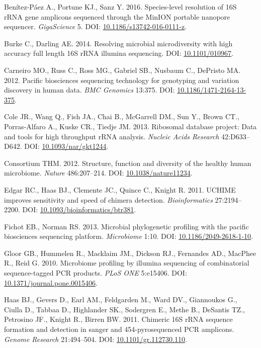 \documentclass[11pt,]{article}
\begin{document}
\hypertarget{ref-BentezPez2016}{}
Benítez-Páez A., Portune KJ., Sanz Y. 2016. Species-level resolution of
16S rRNA gene amplicons sequenced through the MinION portable nanopore
sequencer. \emph{GigaScience} 5. DOI:
\href{https://doi.org/10.1186/s13742-016-0111-z}{10.1186/s13742-016-0111-z}.

\hypertarget{ref-Burke2014}{}
Burke C., Darling AE. 2014. Resolving microbial microdiversity with high
accuracy full length 16S rRNA illumina sequencing. DOI:
\href{https://doi.org/10.1101/010967}{10.1101/010967}.

\hypertarget{ref-Carneiro2012}{}
Carneiro MO., Russ C., Ross MG., Gabriel SB., Nusbaum C., DePristo MA.
2012. Pacific biosciences sequencing technology for genotyping and
variation discovery in human data. \emph{BMC Genomics} 13:375. DOI:
\href{https://doi.org/10.1186/1471-2164-13-375}{10.1186/1471-2164-13-375}.

\hypertarget{ref-Cole2013}{}
Cole JR., Wang Q., Fish JA., Chai B., McGarrell DM., Sun Y., Brown CT.,
Porras-Alfaro A., Kuske CR., Tiedje JM. 2013. Ribosomal database
project: Data and tools for high throughput rRNA analysis. \emph{Nucleic
Acids Research} 42:D633--D642. DOI:
\href{https://doi.org/10.1093/nar/gkt1244}{10.1093/nar/gkt1244}.

\hypertarget{ref-HMP2012}{}
Consortium THM. 2012. Structure, function and diversity of the healthy
human microbiome. \emph{Nature} 486:207--214. DOI:
\href{https://doi.org/10.1038/nature11234}{10.1038/nature11234}.

\hypertarget{ref-Edgar2011}{}
Edgar RC., Haas BJ., Clemente JC., Quince C., Knight R. 2011. UCHIME
improves sensitivity and speed of chimera detection.
\emph{Bioinformatics} 27:2194--2200. DOI:
\href{https://doi.org/10.1093/bioinformatics/btr381}{10.1093/bioinformatics/btr381}.

\hypertarget{ref-Fichot2013}{}
Fichot EB., Norman RS. 2013. Microbial phylogenetic profiling with the
pacific biosciences sequencing platform. \emph{Microbiome} 1:10. DOI:
\href{https://doi.org/10.1186/2049-2618-1-10}{10.1186/2049-2618-1-10}.

\hypertarget{ref-Gloor2010}{}
Gloor GB., Hummelen R., Macklaim JM., Dickson RJ., Fernandes AD.,
MacPhee R., Reid G. 2010. Microbiome profiling by illumina sequencing of
combinatorial sequence-tagged PCR products. \emph{PLoS ONE} 5:e15406.
DOI:
\href{https://doi.org/10.1371/journal.pone.0015406}{10.1371/journal.pone.0015406}.

\hypertarget{ref-Haas2011}{}
Haas BJ., Gevers D., Earl AM., Feldgarden M., Ward DV., Giannoukos G.,
Ciulla D., Tabbaa D., Highlander SK., Sodergren E., Methe B., DeSantis
TZ., Petrosino JF., Knight R., Birren BW. 2011. Chimeric 16S rRNA
sequence formation and detection in sanger and 454-pyrosequenced PCR
amplicons. \emph{Genome Research} 21:494--504. DOI:
\href{https://doi.org/10.1101/gr.112730.110}{10.1101/gr.112730.110}.
\end{document}
